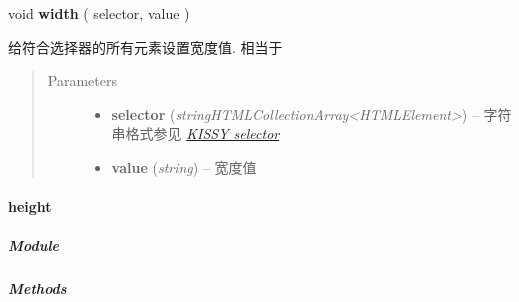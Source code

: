 \documentclass[letterpaper,10pt,english]{sphinxmanual}
\begin{document}
\begin{fulllineitems}
\begin{DUlineblock}{0em}
\item[] void \textbf{width} ( selector, value )
\item[] 给符合选择器的所有元素设置宽度值. 相当于 {\hyperref[api/core/dom/css:DOM.css]{}}
\end{DUlineblock}
\begin{quote}\begin{description}
\item[{Parameters}] \leavevmode\begin{itemize}
\item {}
\textbf{selector} (\emph{string\textbar{}HTMLCollection\textbar{}Array\textless{}HTMLElement\textgreater{}}) -- 字符串格式参见 {\hyperref[api/core/dom/selector:dom-selector]{\emph{KISSY selector}}}

\item {}
\textbf{value} (\emph{string}) -- 宽度值

\end{itemize}

\end{description}\end{quote}

\end{fulllineitems}



\paragraph{height}
\label{api/core/dom/height::doc}\label{api/core/dom/height:height}

\subparagraph{Module}
\label{api/core/dom/height:module}\begin{quote}

{\hyperref[api/core/dom/index:module-DOM]{}}
\end{quote}


\subparagraph{Methods}
\label{api/core/dom/height:methods}
\end{document}
